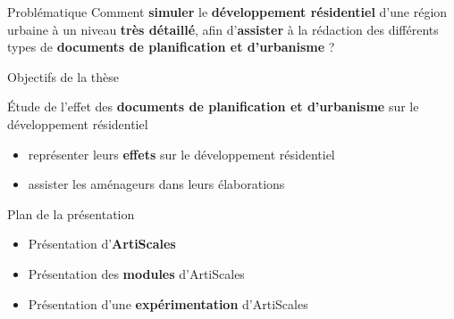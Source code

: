 \documentclass[xcolor=table]{beamer}
\begin{document}
\begin{frame}{Problématique}
Comment \textbf{simuler} le \textbf{développement résidentiel} d'une région urbaine à un niveau \textbf{très détaillé}, afin d'\textbf{assister} à la rédaction des différents types de \textbf{documents de planification et d'urbanisme} ?
\end{frame}

\begin{frame}{Objectifs de la thèse}
	\begin{block}{}
	Étude de l'effet des \textbf{documents de planification et d'urbanisme} sur le développement résidentiel
		\begin{itemize}
			\item représenter leurs \textbf{effets} sur le développement résidentiel
			\item assister les aménageurs dans leurs élaborations
		\end{itemize}
	\end{block}
\end{frame}








\begin{frame}{Plan de la présentation}
	\begin{itemize}
		\item Présentation d'\textbf{ArtiScales}
		\item Présentation des \textbf{modules} d'ArtiScales
		\item Présentation d'une \textbf{expérimentation} d'ArtiScales
	\end{itemize}
\end{frame}
\end{document}
